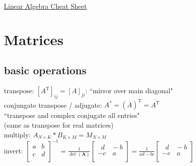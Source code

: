 \setcounter{secnumdepth}{0}


\setlength{\parindent}{0pt}
\setlength{\parskip}{0pt plus 0.5ex}

\newtheorem{example}[section]{Example}


\newcommand{\sect}[1]{\vspace{1mm}\textbf{#1}\\}


\author{Gerold, Edited by Shengliang}

\raggedright
\footnotesize
\begin{multicols}{3}


\setlength{\premulticols}{1pt}
\setlength{\postmulticols}{1pt}
\setlength{\multicolsep}{1pt}
\setlength{\columnsep}{2pt}

\begin{center}
     \Large{\underline{Linear Algebra Cheat Sheet}} \\
\end{center}


\section{Matrices}
\subsection{basic operations}
transpose: $[A^\mathrm{T}]_{ij} = [A]_{ji}$: ``mirror over main diagonal"\\
conjungate transpose / adjugate: 
$A^* = (\overline{A})^\mathrm{T} = \overline{A^\mathrm{T}}$\\
``transpose and complex conjugate all entries"\\(same as transpose for real matrices)\\

multiply: $A_{N \times K} * B_{K \times M} = M_{N \times M}$\\
invert: $\begin{bmatrix}
a & b \\ c & d \\ 
\end{bmatrix}^{-1} =
\frac{1}{\det(\mathbf{A})} \begin{bmatrix}
\,\,\,d & \!\!-b \\ -c & \,a \\ 
\end{bmatrix} =
\frac{1}{ad - bc} \begin{bmatrix}
\,\,\,d & \!\!-b \\ -c & \,a \\ 
\end{bmatrix}$\\




\end{multicols}
